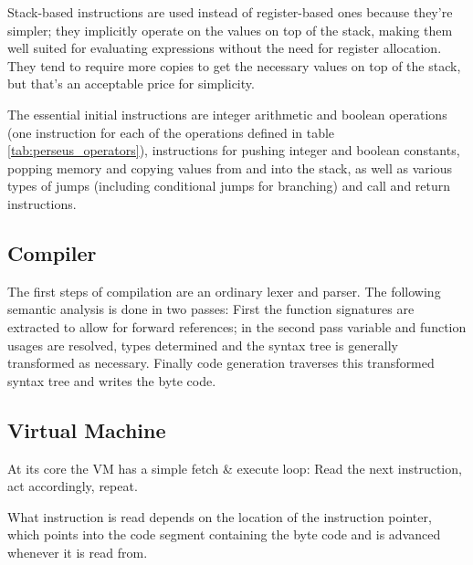 			Stack-based instructions are used instead of register-based ones because they're simpler; they implicitly operate on the values on top of the stack, making them well suited for evaluating expressions without the need for register allocation. They tend to require more copies to get the necessary values on top of the stack, but that's an acceptable price for simplicity.
			
			The essential initial instructions are integer arithmetic and boolean operations (one instruction for each of the operations defined in table \ref{tab:perseus_operators}), instructions for pushing integer and boolean constants, popping memory and copying values from and into the stack, as well as various types of jumps (including conditional jumps for branching) and call and return instructions.
			
		
		\subsection{Compiler}
			
			The first steps of compilation are an ordinary lexer and parser. The following semantic analysis is done in two passes: First the function signatures are extracted to allow for forward references; in the second pass variable and function usages are resolved, types determined and the syntax tree is generally transformed as necessary. Finally code generation traverses this transformed syntax tree and writes the byte code.
			
		\subsection{Virtual Machine}
			
			At its core the VM has a simple fetch \& execute loop: Read the next instruction, act accordingly, repeat.
			
			What instruction is read depends on the location of the instruction pointer, which points into the code segment containing the byte code and is advanced whenever it is read from.
			

